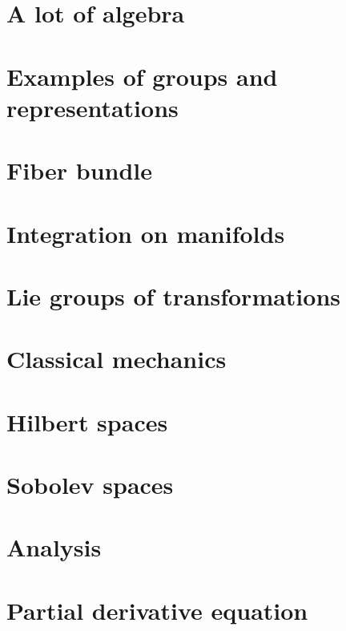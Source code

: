 \documentclass[french,a4paper]{book}
\begin{document}
\chapter{A lot of algebra}




\chapter{Examples of groups and representations}        \label{ChapThoComsGroupes}





\chapter{Fiber bundle}




\chapter{Integration on manifolds}



\chapter{Lie groups of transformations}


\chapter{Classical mechanics}


\chapter{Hilbert spaces}



\chapter{Sobolev spaces}


\chapter{Analysis}




\chapter{Partial derivative equation}

\end{document}
